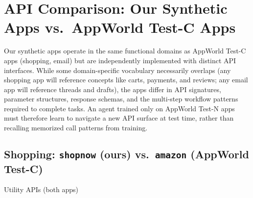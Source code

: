 \documentclass[11pt]{article}
\begin{document}
\section{API Comparison: Our Synthetic Apps vs.\ AppWorld Test-C Apps}

\noindent Our synthetic apps operate in the same functional domains as AppWorld Test-C apps
(shopping, email) but are independently implemented with distinct API interfaces.
While some domain-specific vocabulary necessarily overlaps (any shopping app will reference
concepts like carts, payments, and reviews; any email app will reference threads and drafts),
the apps differ in API signatures, parameter structures, response schemas, and the multi-step
workflow patterns required to complete tasks. An agent trained only on AppWorld Test-N apps
must therefore learn to navigate a new API surface at test time, rather than recalling
memorized call patterns from training.

\subsection*{Shopping: \texttt{shopnow} (ours) vs.\ \texttt{amazon} (AppWorld Test-C)}

\colorbox{utilcolor}{\strut Utility APIs (both apps)}\\[6pt]
\end{document}
